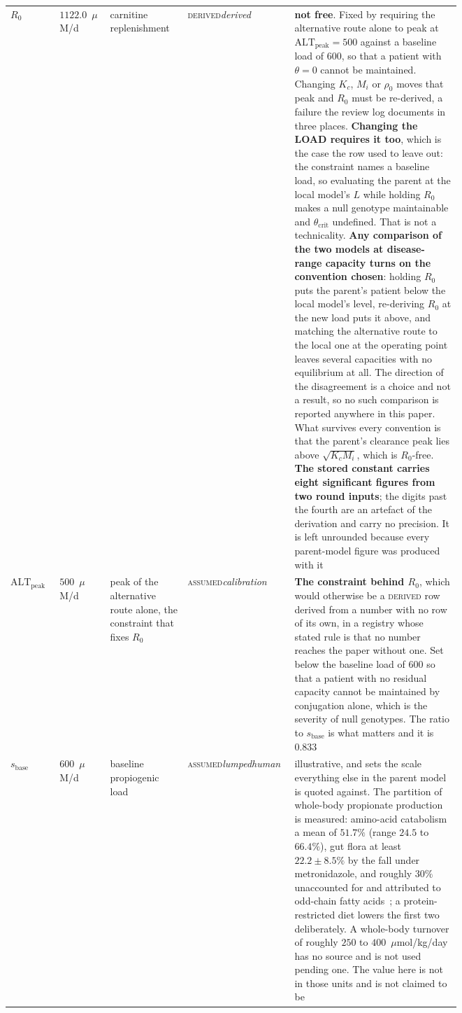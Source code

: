 \begin{longtable}{@{}p{0.08\linewidth} p{0.10\linewidth} p{0.15\linewidth} p{0.085\linewidth} p{0.335\linewidth}@{}}
$R_0$ & $1122.0$~$\mu$M/d & carnitine replenishment & \textsc{derived}\newline \emph{derived} & \textbf{not free}. Fixed by requiring the alternative route alone to peak at $\mathrm{ALT}_{\mathrm{peak}} = 500$ against a baseline load of $600$, so that a patient with $\theta = 0$ cannot be maintained. Changing $K_c$, $M_i$ or $\rho_0$ moves that peak and $R_0$ must be re-derived, a failure the review log documents in three places. \textbf{Changing the LOAD requires it too}, which is the case the row used to leave out: the constraint names a baseline load, so evaluating the parent at the local model's $L$ while holding $R_0$ makes a null genotype maintainable and $\theta_{\mathrm{crit}}$ undefined. That is not a technicality. \textbf{Any comparison of the two models at disease-range capacity turns on the convention chosen}: holding $R_0$ puts the parent's patient below the local model's level, re-deriving $R_0$ at the new load puts it above, and matching the alternative route to the local one at the operating point leaves several capacities with no equilibrium at all. The direction of the disagreement is a choice and not a result, so no such comparison is reported anywhere in this paper. What survives every convention is that the parent's clearance peak lies above $\sqrt{K_c M_i}$, which is $R_0$-free. \textbf{The stored constant carries eight significant figures from two round inputs}; the digits past the fourth are an artefact of the derivation and carry no precision. It is left unrounded because every parent-model figure was produced with it \\
$\mathrm{ALT}_{\mathrm{peak}}$ & $500$~$\mu$M/d & peak of the alternative route alone, the constraint that fixes $R_0$ & \textsc{assumed}\newline \emph{calibration} & \textbf{The constraint behind $R_0$}, which would otherwise be a \textsc{derived} row derived from a number with no row of its own, in a registry whose stated rule is that no number reaches the paper without one. Set below the baseline load of $600$ so that a patient with no residual capacity cannot be maintained by conjugation alone, which is the severity of null genotypes. The ratio to $s_{\mathrm{base}}$ is what matters and it is $0.833$ \\
$s_{\mathrm{base}}$ & $600$~$\mu$M/d & baseline propiogenic load & \textsc{assumed}\newline \emph{lumped}\newline \emph{human} & illustrative, and sets the scale everything else in the parent model is quoted against. The partition of whole-body propionate production is measured: amino-acid catabolism a mean of $51.7\%$ (range $24.5$ to $66.4\%$), gut flora at least $22.2 \pm 8.5\%$ by the fall under metronidazole, and roughly $30\%$ unaccounted for and attributed to odd-chain fatty acids~\cite{propionate_sources}; a protein-restricted diet lowers the first two deliberately. A whole-body turnover of roughly $250$ to $400$~$\mu$mol/kg/day has no source and is not used pending one. The value here is not in those units and is not claimed to be \\

\end{longtable}
